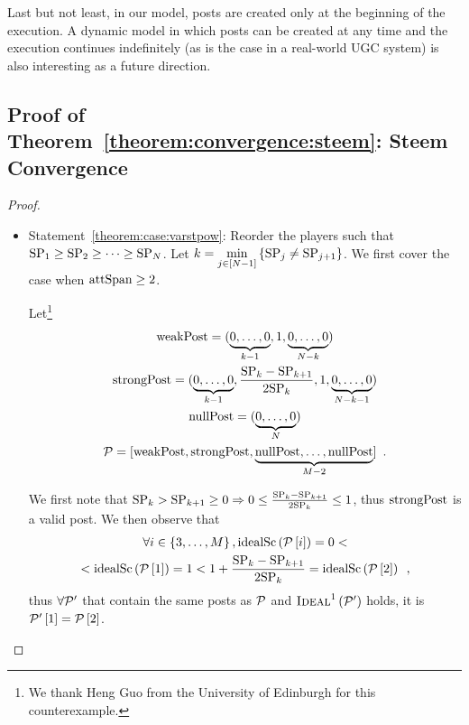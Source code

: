 \documentclass[a4paper,english,cleveref, autoref]{oasics-v2019}
\begin{document}
  Last but not least, in our model, posts are created only at the beginning of
  the execution. A dynamic model in which posts can be created at any time and
  the execution continues indefinitely (as is the case in a real-world UGC
  system) is also interesting as a future direction.
\begin{subappendices}
  \appendix
\section{Proof of Theorem~\ref{theorem:convergence:steem}: Steem Convergence}
  \label{appendix:proof}
\begin{proof}
  \begin{itemize}
    \item Statement~\ref{theorem:case:varstpow}: Reorder the players such that
    $\mathrm{SP}_1 \geq \mathrm{SP}_2 \geq \dots \geq \mathrm{SP}_{N}$. Let $k =
    \min\limits_{j \in \left[N - 1\right]}\left\{\mathrm{SP}_j \neq
    \mathrm{SP}_{j+1}\right\}$. We first cover the case when $\mathrm{attSpan} \geq 2$.

    Let\footnote{We thank Heng Guo from the University of Edinburgh for this
    counterexample.}
    \begin{gather*}
      \mathrm{weakPost} = (\underbrace{0, \dots, 0}_{k - 1}, 1, \underbrace{0,
      \dots, 0}_{N - k}) \\
      \mathrm{strongPost} = (\underbrace{0, \dots, 0}_{k - 1}, \frac{\mathrm{SP}_k -
      \mathrm{SP}_{k + 1}}{2\mathrm{SP}_k}, 1, \underbrace{0, \dots, 0}_{N - k -
      1}) \\
      \mathrm{nullPost} = (\underbrace{0, \dots, 0}_{N}) \\
      \mathcal{P} = [\mathrm{weakPost}, \mathrm{strongPost}, \underbrace{\mathrm{nullPost}, \dots,
      \mathrm{nullPost}}_{M - 2}] \enspace.
    \end{gather*}

    We first note that $\mathrm{SP}_k > \mathrm{SP}_{k+1} \geq 0 \Rightarrow 0 \leq
    \frac{\mathrm{SP}_k - \mathrm{SP}_{k + 1}}{2\mathrm{SP}_k} \leq 1$, thus $\mathrm{strongPost}$ is a
    valid post. We then observe that
    \begin{gather*}
      \forall i \in \left\{3, \dots, M\right\},
      \mathrm{idealSc}\left(\mathcal{P}\left[i\right]\right) = 0 < \\
      <\mathrm{idealSc}\left(\mathcal{P}\left[1\right]\right) = 1 < 1 + \frac{\mathrm{SP}_k -
      \mathrm{SP}_{k+1}}{2\mathrm{SP}_k} = \mathrm{idealSc}\left(\mathcal{P}\left[2\right]\right) \enspace,
    \end{gather*}
    thus $\forall \mathcal{P}'$ that contain the same posts as $\mathcal{P}$ and
    $\textsc{Ideal}^1\left(\mathcal{P}'\right)$ holds, it is
    $\mathcal{P}'\left[1\right] = \mathcal{P}\left[2\right]$.


\end{itemize}
\end{proof}
\end{subappendices}
\end{document}
